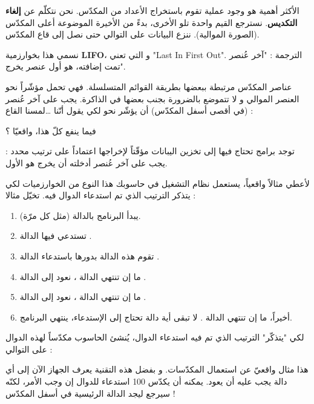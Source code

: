 الأكثر أهمية هو وجود عملية تقوم باستخراج الأعداد من المكدّس. نحن نتكلّم عن
\textbf{إلغاء التكديس}.
نسترجع القيم واحدة تلو الأخرى، بدءً من الأخيرة الموضوعة أعلى المكدّس (الصورة الموالية). ننزع البيانات على التوالي حتى نصل إلى قاع المكدّس.


نسمي هذا بخوارزمية
\textbf{\textenglish{LIFO}}،
و التي تعني
"\textenglish{Last In First Out}".
الترجمة : "آخر عُنصر تمت إضافته، هو أول عنصر يخرج".

عناصر المكدّس مرتبطة ببعضها بطريقة القوائم المتسلسلة. فهي تحمل مؤشّراً نحو العنصر الموالي و لا تتموضع بالضرورة بجنب بعضها في الذاكرة. يجب على آخر عُنصر (في أقصى أسفل المكدّس) أن يؤشّر نحو
لكي يقول أنّنا \dots لمسنا القاع :


\begin{question}
 فيما ينفع كلّ هذا، واقعيّا ؟
\end{question}

توجد برامج تحتاج فيها إلى تخزين اليبانات مؤقّتاً لإخراجها اعتماداً على ترتيب محدد : يجب على آخر عُنصر أدخلته أن يخرج هو الأول.

لأعطي مثالاً واقعياً، يستعمل نظام التشغيل في حاسوبك هذا النوع من الخوارزميات لكي يتذكر الترتيب الذي تم استدعاء الدوال فيه. تخيّل مثالا :

\begin{enumerate}
	\item يبدأ البرنامج بالدالة
	(مثل كل مرّة).
	\item تستدعي فيها الدالة 
	.
	\item تقوم هذه الدالة 
	بدورها باستدعاء الدالة
	.
	\item ما إن تنتهي الدالة
	،
	نعود إلى الدالة
	.
	\item ما إن تنتهي الدالة 
	،
	نعود إلى الدالة 
	.
	\item أخيراً، ما إن تنتهي الدالة
	.
	لا تبقى أية دالة تحتاج إلى الإستدعاء، ينتهي البرنامج.
\end{enumerate}

لكي "يتذكّر" الترتيب الذي تم فيه استدعاء الدوال، يُنشئ الحاسوب مكدّساً لهذه الدوال على التوالي :


هذا مثال واقعيّ عن استعمال المكدّسات. و بفضل هذه التقنية يعرف الجهاز الآن إلى أي دالة يجب عليه أن يعود. يمكنه أن يكدّس 100 استدعاء للدوال إن وجب الأمر، لكنّه سيرجع ليجد الدالة الرئيسية في أسفل المكدّس !

